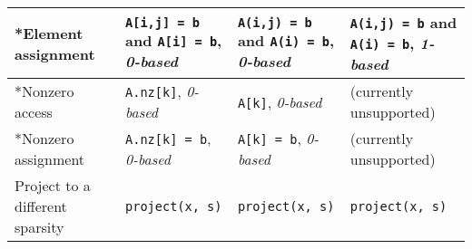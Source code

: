 \documentclass[a4paper,12pt]{book}
\begin{document}
\begin{center}
\begin{tabular}{| p{3.5cm} | p{3.5cm} | p{3.5cm} | p{3.5cm} | }
    *Element assignment
    & \verb|A[i,j] = b| and \verb|A[i] = b|, \linebreak \emph{0-based}
    & \verb|A(i,j) = b| and \verb|A(i) = b|, \linebreak \emph{0-based}
    & \verb|A(i,j) = b| and \verb|A(i) = b|, \linebreak \emph{1-based} \\ \hline
    *Nonzero access
    & \verb|A.nz[k]|, \emph{0-based}
    & \verb|A[k]|, \emph{0-based}
    & (currently unsupported) \\ \hline
    *Nonzero assignment
    & \verb|A.nz[k] = b|, \emph{0-based}
    & \verb|A[k] = b|, \emph{0-based}
    & (currently unsupported) \\ \hline
    Project to a different sparsity
    & \verb|project(x, s)| & \verb|project(x, s)| & \verb|project(x, s)| \\ \hline
  \end{tabular}
\end{center}

%
%
\end{document}
